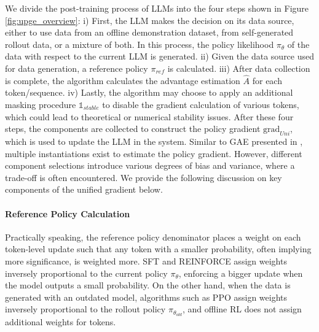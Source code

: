 \documentclass{article} %
\newcommand{\0}{\mathbb{0}}
\newcommand{\1}{\mathbb{1}}
\begin{document}
We divide the post-training process of LLMs into the four steps shown in Figure \ref{fig:upge_overview}: i) First, the LLM makes the decision on its data source, either to use data from an offline demonstration dataset, from self-generated rollout data, or a mixture of both. In this process, the policy likelihood $\pi_\theta$ of the data with respect to the current LLM is generated. ii) Given the data source used for data generation, a reference policy $\pi_{ref}$ is calculated. iii) After data collection is complete, the algorithm calculates the advantage estimation $\hat{A}$ for each token/sequence. iv) Lastly, the algorithm may choose to apply an additional masking procedure $\mathbb{1}_{stable}$ to disable the gradient calculation of various tokens, which could lead to theoretical or numerical stability issues. After these four steps, the components are collected to construct the policy gradient $\text{grad}_{Uni}$, which is used to update the LLM in the system. 
Similar to GAE presented in \citep{schulman2015high}, multiple instantiations exist to estimate the policy gradient. However, different component selections introduce various degrees of bias and variance, where a trade-off is often encountered. 
We provide the following discussion on key components of the unified gradient below.






\paragraph{Reference Policy Calculation}
Practically speaking, the reference policy denominator places a weight on each token-level update such that any token with a smaller probability, often implying more significance, is weighted more. 
SFT and REINFORCE assign weights inversely proportional to the current policy $\pi_\theta$, enforcing a bigger update when the model outputs a small probability. 
On the other hand, when the data is generated with an outdated model, algorithms such as PPO assign weights inversely proportional to the rollout policy $\pi_{\theta_{old}}$, and offline RL does not assign additional weights for tokens.
\end{document}
